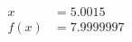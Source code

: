 \documentclass[preview]{standalone}
\begin{document}
\begin{align*}
x &= 5.0015\\f(x) &= 7.9999997
\end{align*}
\end{document}
